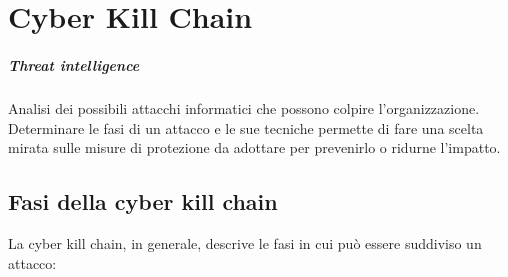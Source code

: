 \chapter{Cyber Kill Chain}
\label{chapter2}

\paragraph{Threat intelligence} Analisi dei possibili attacchi informatici che possono colpire l'organizzazione. Determinare le fasi di un attacco e le sue tecniche permette di fare una scelta mirata sulle misure di protezione da adottare per prevenirlo o ridurne l'impatto. \\

\section{Fasi della cyber kill chain}
La cyber kill chain, in generale, descrive le fasi in cui può essere suddiviso un attacco:
